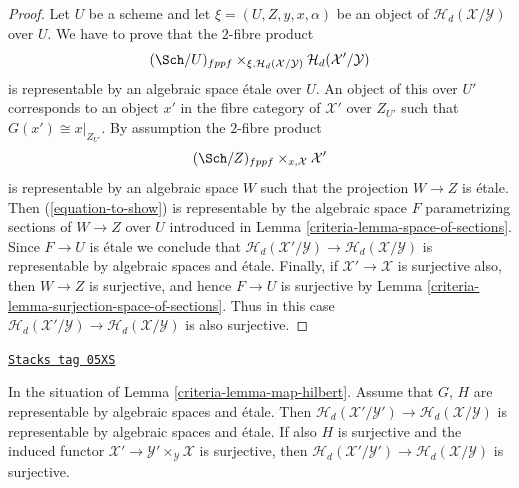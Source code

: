 \begin{proof}

Let $U$ be a scheme and let $\xi = (U, Z, y, x, \alpha)$ be an object of
$\mathcal{H}_d(\mathcal{X}/\mathcal{Y})$ over $U$.
We have to prove that the $2$-fibre product
\begin{equation}
\label{equation-to-show}
(\Sch/U)_{fppf}
\times_{\xi, \mathcal{H}_d(\mathcal{X}/\mathcal{Y})}
\mathcal{H}_d(\mathcal{X}'/\mathcal{Y})
\end{equation}
is representable by an algebraic space \'etale over $U$.
An object of this over $U'$ corresponds to an object
$x'$ in the fibre category of $\mathcal{X}'$ over $Z_{U'}$
such that $G(x') \cong x|_{Z_{U'}}$.
By assumption the $2$-fibre product
$$
(\Sch/Z)_{fppf} \times_{x, \mathcal{X}} \mathcal{X}'
$$
is representable by an algebraic space $W$ such that the projection
$W \to Z$ is \'etale. Then (\ref{equation-to-show})
is representable by the algebraic space $F$ parametrizing sections of
$W \to Z$ over $U$ introduced in
Lemma \ref{criteria-lemma-space-of-sections}.
Since $F \to U$ is \'etale we conclude that
$\mathcal{H}_d(\mathcal{X}'/\mathcal{Y}) \to
\mathcal{H}_d(\mathcal{X}/\mathcal{Y})$ is representable by
algebraic spaces and \'etale.
Finally, if $\mathcal{X}' \to \mathcal{X}$ is surjective also,
then $W \to Z$ is surjective, and hence $F \to U$ is surjective by
Lemma \ref{criteria-lemma-surjection-space-of-sections}.
Thus in this case
$\mathcal{H}_d(\mathcal{X}'/\mathcal{Y}) \to
\mathcal{H}_d(\mathcal{X}/\mathcal{Y})$ is also surjective.
\end{proof}

\begin{lemma}
\label{criteria-lemma-etale-map-hilbert}
\href{https://stacks.math.columbia.edu/tag/05XS}{\texttt{Stacks tag 05XS}}

In the situation of
Lemma \ref{criteria-lemma-map-hilbert}.
Assume that $G$, $H$ are representable by algebraic spaces and \'etale.
Then $\mathcal{H}_d(\mathcal{X}'/\mathcal{Y}') \to
\mathcal{H}_d(\mathcal{X}/\mathcal{Y})$ is representable by
algebraic spaces and \'etale.
If also $H$ is surjective and the induced functor
$\mathcal{X}' \to \mathcal{Y}' \times_\mathcal{Y} \mathcal{X}$
is surjective, then
$\mathcal{H}_d(\mathcal{X}'/\mathcal{Y}') \to
\mathcal{H}_d(\mathcal{X}/\mathcal{Y})$ is surjective.
\end{lemma}

